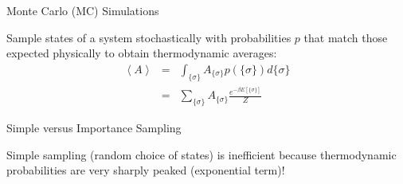 \documentclass[aspectratio=169]{beamer}
\begin{document}
    \begin{frame}{Monte Carlo (MC) Simulations}

        Sample states of a system stochastically with probabilities $p$ that match those expected physically to obtain thermodynamic averages:
        \begin{eqnarray*}
            \left< A \right> & = & \int_{\{\sigma\}} A_{\{\sigma\}} p(\{\sigma\}) d \{\sigma\}\\
            & = & \sum_{\{\sigma\}} A_{\{\sigma\}} \frac{e^{-\beta E[\{\sigma\}]}}{Z}
        \end{eqnarray*}

    \end{frame}

    \begin{frame}{Simple versus Importance Sampling}

        Simple sampling (random choice of states) is inefficient because thermodynamic probabilities are very sharply peaked (exponential term)!

        \begin{figure}
        \end{figure}

    \end{frame}
\end{document}
